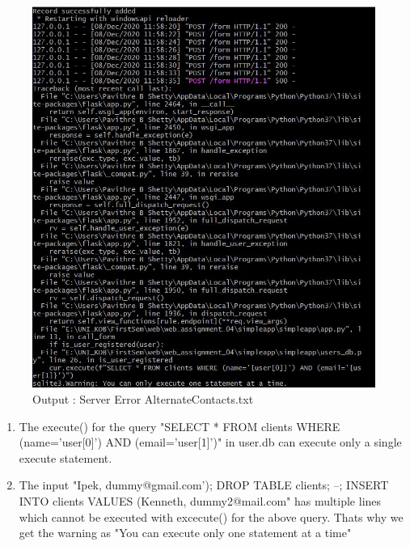 \documentclass{resources/WeSTassignment}
\begin{document}
\begin{figure}[ht]
   			\centering
   			\includegraphics[scale=0.4]{resources/finalAlternateServerError.JPG}
   			\caption{Output : Server Error AlternateContacts.txt}
   			\label{fig: Server Error AlternateContacts.txt}
\end{figure}
\begin{enumerate}
\item The execute() for the query "SELECT * FROM clients WHERE (name='{user[0]}') AND (email='{user[1]}')" in user.db can execute only a single execute statement. 
\item The input "Ipek, dummy@gmail.com'); DROP TABLE clients; --; INSERT INTO clients VALUES (Kenneth, dummy2@mail.com" has multiple lines which cannot be executed with excecute() for the above query. Thats why we get the warning as "You can execute only one statement at a time"
\end{enumerate}
\end{document}
